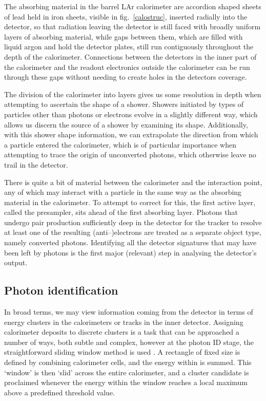 The absorbing material in the barrel LAr calorimeter are accordion shaped sheets of lead held in iron sheets, visible in fig.~\ref{calostruc}, inserted radially into the detector, so that radiation leaving the detector is still faced with broadly uniform layers of absorbing material, while gaps between them, which are filled with liquid argon and hold the detector plates, still run contiguously throughout the depth of the calorimeter. Connections between the detectors in the inner part of the calorimeter and the readout electronics outside the calorimeter can be run through these gaps without needing to create holes in the detectors coverage.

The division of the calorimeter into layers gives us some resolution in depth when attempting to ascertain the shape of a shower. Showers initiated by types of particles other than photons or electrons evolve in a slightly different way, which allows us discern the source of a shower by examining its shape. Additionally, with this shower shape information, we can extrapolate the direction from which a particle entered the calorimeter, which is of particular importance when attempting to trace the origin of unconverted photons, which otherwise leave no trail in the detector.

There is quite a bit of material between the calorimeter and the interaction point, any of which may interact with a particle in the same way as the absorbing material in the calorimeter. To attempt to correct for this, the first active layer, called the presampler, sits ahead of the first absorbing layer. Photons that undergo pair production sufficiently deep in the detector for the tracker to resolve at least one of the resulting (anti--)electrons are treated as a separate object type, namely converted photons. Identifying all the detector signatures that may have been left by photons is the first major (relevant) step in analysing the detector's output.

\subsection{Photon identification}
In broad terms, we may view information coming from the detector in terms of energy clusters in the calorimeters or tracks in the inner detector. Assigning calorimeter deposits to discrete clusters is a task that can be approached a number of ways, both subtle and complex, however at the photon ID stage, the straightforward sliding window method is used \cite{atlascluster:sw}. A rectangle of fixed size is defined by combining calorimeter cells, and the energy within is summed. This `window' is then `slid' across the entire calorimeter, and a cluster candidate is proclaimed whenever the energy within the window reaches a local maximum above a predefined threshold value.

